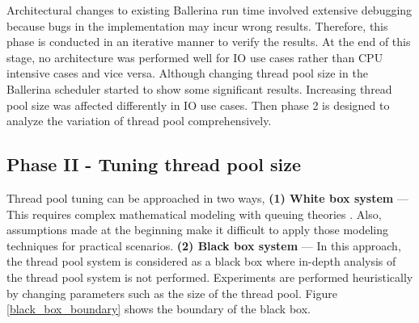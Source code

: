 Architectural changes to existing Ballerina run time involved extensive debugging because bugs in the implementation may incur wrong results. Therefore, this phase is conducted in an iterative manner to verify the results.
At the end of this stage, no architecture was performed well for IO use cases rather than CPU intensive cases and vice versa. Although changing thread pool size in the Ballerina scheduler started to show some significant results. Increasing thread pool size was affected differently in IO use cases. Then phase 2 is designed to analyze the variation of thread pool comprehensively.



\subsection{Phase II - Tuning thread pool size}

Thread pool tuning can be approached in two ways, \textbf{(1) White box system} — This requires complex mathematical modeling with queuing theories \cite{math_aproach_thread_pool_tuning}. Also, assumptions made at the beginning make it difficult to apply those modeling techniques for practical scenarios. \textbf{(2) Black box system} — In this approach, the thread pool system is considered as a black box where in-depth analysis of the thread pool system is not performed. Experiments are performed heuristically by changing parameters such as the size of the thread pool. Figure \ref{black_box_boundary} shows the boundary of the black box.
 
